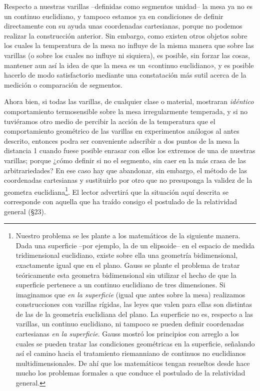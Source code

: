 \documentclass[spanish]{book}
\begin{document}
Respecto a nuestras varillas --definidas como segmentos unidad-- la mesa ya no es un
continuo euclidiano, y tampoco estamos ya en condiciones de definir directamente con
su ayuda unas coordenadas cartesianas, porque no podemos realizar la construcción
anterior. Sin embargo, como existen otros objetos sobre los cuales la temperatura de
la mesa no influye de la misma manera que sobre las varillas (o sobre los cuales no
influye ni siquiera), es posible, sin forzar las cosas, mantener aun así la idea de que la
mesa es un «continuo euclidiano», y es posible hacerlo de modo satisfactorio mediante
una constatación más sutil acerca de la medición o comparación de segmentos.

Ahora bien, si todas las varillas, de cualquier clase o material, mostraran \textit{idéntico}
comportamiento termosensible sobre la mesa irregularmente temperada, y si no
tuviéramos otro medio de percibir la acción de la temperatura que el comportamiento
geométrico de las varillas en experimentos análogos al antes descrito, entonces podra
ser conveniente adscribir a dos puntos de la mesa la distancia 1 cuando fuese posible
enrasar con ellos los extremos de una de nuestras varillas; porque ¿cómo definir si no
el segmento, sin caer en la más crasa de las arbitrariedades? En ese caso hay que abandonar,
sin embargo, el método de las coordenadas cartesianas y sustituirlo por otro
que no presuponga la validez de la geometra euclidiana\footnote{Nuestro problema se les 
plante a los matemáticos de la siguiente manera. Dada una superficie --por
ejemplo, la de un elipsoide-- en el espacio de medida tridimensional euclidiano, 
existe sobre ella una geometría bidimensional, exactamente igual que en el plano. Gauss
se plante el problema de tratar teóricamente esta geometra bidimensional sin utilizar el
hecho de que la superficie pertenece a un continuo euclidiano de tres dimensiones. Si 
imaginamos que \textit{en la superficie} (igual que antes sobre la mesa) realizamos
construcciones con varillas rígidas, las leyes que valen para ellas son distintas de 
las de la geometría euclidiana del plano. La superficie no es, respecto a las varillas,
un continuo euclidiano, ni tampoco se pueden definir coordenadas cartesianas \textit{en 
la superficie}. Gauss mostró los principios con arreglo a los cuales se pueden tratar
las condiciones geométricas en la superficie, señalando así el camino hacia el tratamiento
riemanniano de continuos no euclidianos multidimensionales. De ahí que los matemáticos tengan
resueltos desde hace mucho los problemas formales a que conduce el postulado de la relatividad
general.}. El lector advertirá que la situación aquí descrita se corresponde con aquella que
ha traído consigo el postulado de la relatividad general (\S 23).
\end{document}
